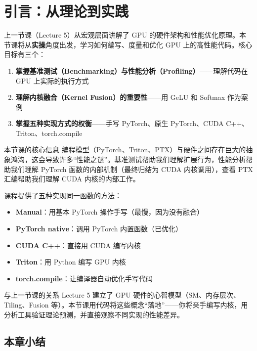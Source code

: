 \documentclass[a4paper]{article}
\begin{document}

\section{引言：从理论到实践}

上一节课（Lecture 5）从宏观层面讲解了 GPU 的硬件架构和性能优化原理。本节课将从\textbf{实操}角度出发，学习如何编写、度量和优化 GPU 上的高性能代码。核心目标有三个：

\begin{enumerate}
    \item \textbf{掌握基准测试（Benchmarking）与性能分析（Profiling）}——理解代码在 GPU 上实际的执行方式
    \item \textbf{理解内核融合（Kernel Fusion）的重要性}——用 GeLU 和 Softmax 作为案例
    \item \textbf{掌握五种实现方式的权衡}——手写 PyTorch、原生 PyTorch、CUDA C++、Triton、torch.compile
\end{enumerate}

\begin{importantbox}{本节课的核心信息}
编程模型（PyTorch、Triton、PTX）与硬件之间存在巨大的抽象鸿沟，这会导致许多``性能之谜''。基准测试帮助我们理解扩展行为，性能分析帮助我们理解 PyTorch 函数的内部机制（最终归结为 CUDA 内核调用），查看 PTX 汇编帮助我们理解 CUDA 内核的内部工作。
\end{importantbox}

课程提供了五种实现同一函数的方法：
\begin{itemize}
    \item \textbf{Manual}：用基本 PyTorch 操作手写（最慢，因为没有融合）
    \item \textbf{PyTorch native}：调用 PyTorch 内置函数（已优化）
    \item \textbf{CUDA C++}：直接用 CUDA 编写内核
    \item \textbf{Triton}：用 Python 编写 GPU 内核
    \item \textbf{torch.compile}：让编译器自动优化手写代码
\end{itemize}

\begin{knowledgebox}{与上一节课的关系}
Lecture 5 建立了 GPU 硬件的心智模型（SM、内存层次、Tiling、Fusion 等）。本节课用代码将这些概念``落地''——你将亲手编写内核，用分析工具验证理论预测，并直接观察不同实现的性能差异。
\end{knowledgebox}

\subsection{本章小结}
\end{document}
